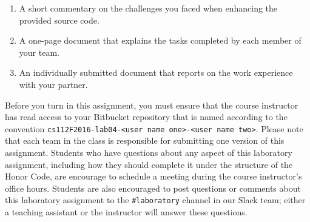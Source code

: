 \begin{enumerate}
  \item A short commentary on the challenges you faced when enhancing the provided source code.

  \item A one-page document that explains the tasks completed by each member of your team.

  \item An individually submitted document that reports on the work experience with your partner.

\end{enumerate}

\vspace*{-.05in}

Before you turn in this assignment, you must ensure that the course instructor has read access to your Bitbucket
repository that is named according to the convention {\tt cs112F2016-lab04-<user name one>-<user name two>}. Please note
that each team in the class is responsible for submitting one version of this assignment. Students who have questions
about any aspect of this laboratory assignment, including how they should complete it under the structure of the Honor
Code, are encourage to schedule a meeting during the course instructor's office hours. Students are also encouraged to
post questions or comments about this laboratory assignment to the {\tt \#laboratory} channel in our Slack team; either
a teaching assistant or the instructor will answer these questions.


